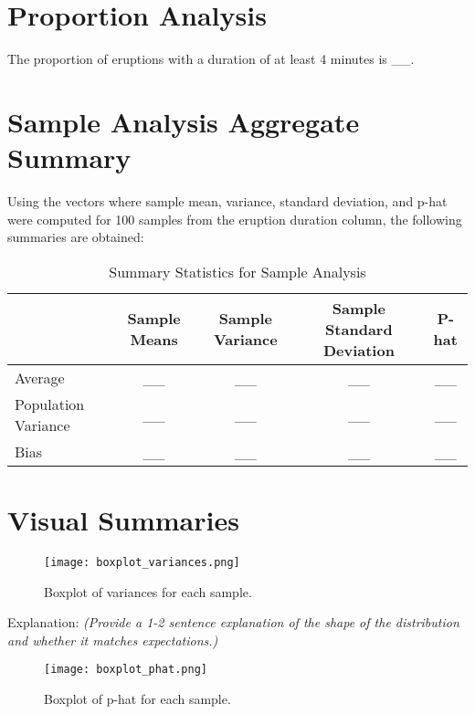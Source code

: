 \documentclass{article}
\begin{document}
\section{Proportion Analysis}

The proportion of eruptions with a duration of at least 4 minutes is \_\_.

\section{Sample Analysis Aggregate Summary}

Using the vectors where sample mean, variance, standard deviation, and p-hat were computed for 100 samples from the eruption duration column, the following summaries are obtained:

\begin{table}[H]
    \centering
    \begin{tabular}{lcccc}
        \toprule
        & Sample Means & Sample Variance & Sample Standard Deviation & P-hat \\
        \midrule
        Average & \_\_ & \_\_ & \_\_ & \_\_ \\
        Population Variance & \_\_ & \_\_ & \_\_ & \_\_ \\
        Bias & \_\_ & \_\_ & \_\_ & \_\_ \\
        \bottomrule
    \end{tabular}
    \caption{Summary Statistics for Sample Analysis}
    \label{tab:sample_analysis}
\end{table}

\section{Visual Summaries}

\begin{figure}[H]
    \centering
    \texttt{[image: boxplot\_variances.png]} %
    \caption{Boxplot of variances for each sample.}
    \label{fig:boxplot_variances}
\end{figure}

Explanation: \textit{(Provide a 1-2 sentence explanation of the shape of the distribution and whether it matches expectations.)}

\begin{figure}[H]
    \centering
    \texttt{[image: boxplot\_phat.png]} %
    \caption{Boxplot of p-hat for each sample.}
    \label{fig:boxplot_phat}
\end{figure}
\end{document}
